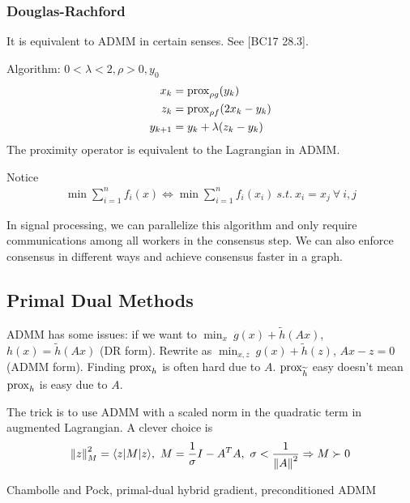 \documentclass[class=article,crop=false]{standalone}
\begin{document}
\subsubsection{Douglas-Rachford}
It is equivalent to ADMM in certain senses. See [BC17 28.3].

Algorithm: $ 0< \lambda<2, \rho>0, y_0$
\begin{align*}
	x_k&= \operatorname{prox}_{\rho g}(y_k) \\
	z_k&= \operatorname{prox}_{\rho f}(2x_k -y_k) \\
	y_{k+1} &= y_k + \lambda(z_k -y_k)
\end{align*}
The proximity operator is equivalent to the Lagrangian in ADMM.

Notice
\begin{align*}
	\min \sum_{ i= 1}^{ n} f_i(x) \iff \min \sum_{ i= 1}^{ n} f_i(x_i)\ s.t.\ x_i=x_j \ \forall \ i,j
\end{align*}
\begin{remark}
In signal processing, we can parallelize this algorithm and only require communications among all workers in the consensus step. We can also enforce consensus in different ways and achieve consensus faster in a graph.
\end{remark}
\subsection{Primal Dual Methods}
ADMM has some issues: if we want to $ \min_{x}\ g(x)+ \widetilde{ h}(Ax)$, $ h(x) = \widetilde{ h}(Ax)$ (DR form). Rewrite as $ \min_{x,z}\ g(x) + \widetilde{ h}(z)$, $ Ax-z=0$ (ADMM form). Finding $ \operatorname{prox}_{h}$ is often hard due to $ A$.  $ \operatorname{prox}_{\widetilde{ h}}$ easy doesn't mean $ \operatorname{prox}_{h}$ is easy due to $ A$.

The trick is to use ADMM with a scaled norm in the quadratic term in augmented Lagrangian. A clever choice is
\begin{align*}
	{\left\lVert{ z}\right\rVert} _{M}^2 = \langle z|M|z \rangle,\ M = \frac{1}{\sigma} I - A^{T}A,\ \sigma< \frac{1}{{\left\lVert{ A}\right\rVert}^2 }\Rightarrow M \succ 0
\end{align*}

Chambolle and Pock, primal-dual hybrid gradient, preconditioned ADMM
\end{document}
